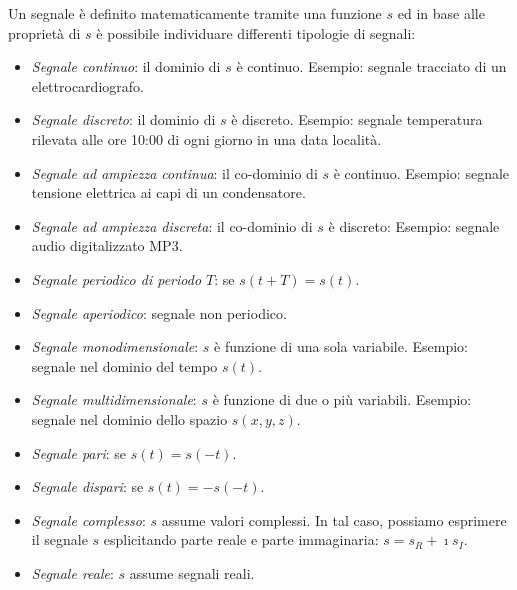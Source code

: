 Un segnale \`e  definito matematicamente tramite una funzione $s$ ed in base alle propriet\`a di $s$ \`e possibile individuare differenti tipologie di segnali:
\begin{itemize}
\item \textit{Segnale continuo}: il dominio di $s$ \`e  continuo. Esempio: segnale tracciato di un elettrocardiografo.
\item \textit{Segnale discreto}: il dominio di $s$ \`e  discreto. Esempio: segnale temperatura rilevata alle ore 10:00 di ogni giorno in una data localit\`a.
\item \textit{Segnale ad ampiezza continua}: il co-dominio  di $s$ \`e  continuo. Esempio: segnale tensione elettrica ai capi di un condensatore.
\item \textit{Segnale ad ampiezza discreta}: il co-dominio di $s$ \`e  discreto: Esempio: segnale audio digitalizzato MP3.
\item \textit{Segnale periodico di periodo $T$}: se $s(t+T)=s(t)$.
\item \textit{Segnale aperiodico}: segnale non periodico.
\item \textit{Segnale monodimensionale}: $s$ \`e  funzione di una sola variabile. Esempio: segnale nel dominio del tempo $s(t)$.
\item \textit{Segnale multidimensionale}: $s$ \`e  funzione di due o pi\`u variabili. Esempio: segnale nel dominio dello spazio $s(x,y,z)$.
\item \textit{Segnale pari}: se $s(t)=s(-t)$.
\item \textit{Segnale dispari}: se $s(t)=-s(-t)$.
\item \textit{Segnale complesso}: $s$ assume valori complessi. In tal caso, possiamo esprimere il segnale $s$ esplicitando parte reale e parte immaginaria: $s=s_R+\imath s_I$.
\item \textit{Segnale reale}: $s$ assume segnali reali.
\end{itemize}
%
%
%
%

